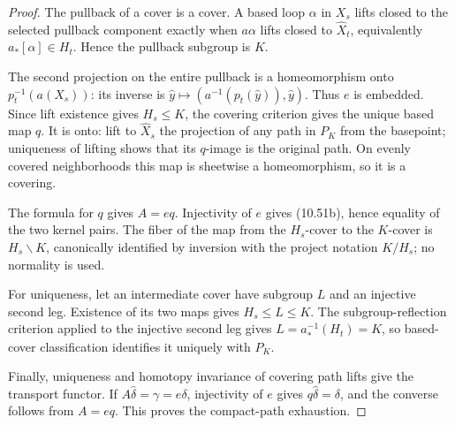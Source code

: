 \begin{proof}
The pullback of a cover is a cover. A based loop \(\alpha\) in \(X_s\) lifts closed to the selected pullback component exactly when \(a\alpha\) lifts closed to \(\hat X_t\), equivalently \(a_*[\alpha]\in H_t\). Hence the pullback subgroup is \(K\).

The second projection on the entire pullback is a homeomorphism onto \(p_t^{-1}(a(X_s))\): its inverse is \(\hat y\mapsto(a^{-1}(p_t(\hat y)),\hat y)\). Thus \(e\) is embedded. Since lift existence gives \(H_s\le K\), the covering criterion gives the unique based map \(q\). It is onto: lift to \(\hat X_s\) the projection of any path in \(P_K\) from the basepoint; uniqueness of lifting shows that its \(q\)-image is the original path. On evenly covered neighborhoods this map is sheetwise a homeomorphism, so it is a covering.

The formula for \(q\) gives \(A=eq\). Injectivity of \(e\) gives (10.51b), hence equality of the two kernel pairs. The fiber of the map from the \(H_s\)-cover to the \(K\)-cover is \(H_s\backslash K\), canonically identified by inversion with the project notation \(K/H_s\); no normality is used.

For uniqueness, let an intermediate cover have subgroup \(L\) and an injective second leg. Existence of its two maps gives \(H_s\le L\le K\). The subgroup-reflection criterion applied to the injective second leg gives \(L=a_*^{-1}(H_t)=K\), so based-cover classification identifies it uniquely with \(P_K\).

Finally, uniqueness and homotopy invariance of covering path lifts give the transport functor. If \(A\hat\delta=\gamma=e\delta\), injectivity of \(e\) gives \(q\hat\delta=\delta\), and the converse follows from \(A=eq\). This proves the compact-path exhaustion.
\end{proof}